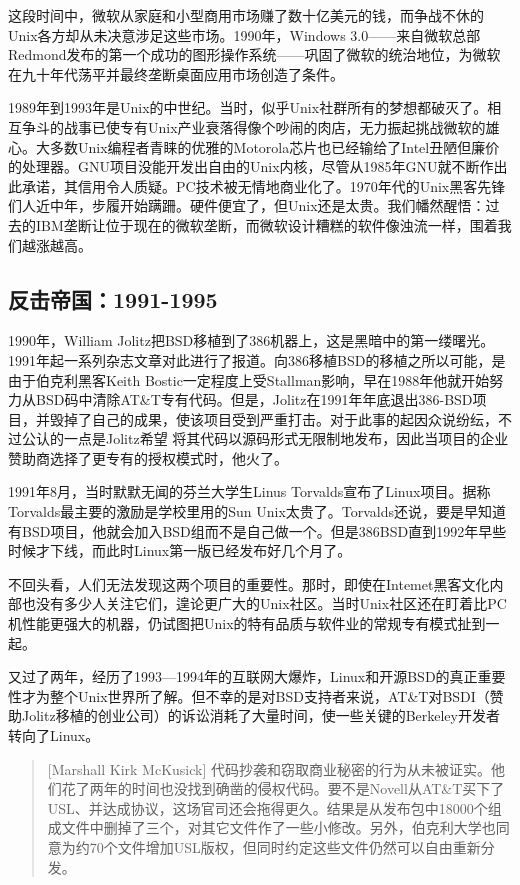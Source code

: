\documentclass[11pt,oneside]{book}
\begin{document}
\begin{common-format}
这段时间中，微软从家庭和小型商用市场赚了数十亿美元的钱，而争战不休的Unix各方却从未决意涉足这些市场。1990年，Windows 3.0——来自微软总部Redmond发布的第一个成功的图形操作系统——巩固了微软的统治地位，为微软在九十年代荡平并最终垄断桌面应用市场创造了条件。

1989年到1993年是Unix的中世纪。当时，似乎Unix社群所有的梦想都破灭了。相互争斗的战事已使专有Unix产业衰落得像个吵闹的肉店，无力振起挑战微软的雄心。大多数Unix编程者青睐的优雅的Motorola芯片也已经输给了Intel丑陋但廉价的处理器。GNU项目没能开发出自由的Unix内核，尽管从1985年GNU就不断作出此承诺，其信用令人质疑。PC技术被无情地商业化了。1970年代的Unix黑客先锋们人近中年，步履开始蹒跚。硬件便宜了，但Unix还是太贵。我们幡然醒悟：过去的IBM垄断让位于现在的微软垄断，而微软设计糟糕的软件像浊流一样，围着我们越涨越高。

\subsection{反击帝国：1991-1995}
1990年，William Jolitz把BSD移植到了386机器上，这是黑暗中的第一缕曙光。1991年起一系列杂志文章对此进行了报道。向386移植BSD的移植之所以可能，是由于伯克利黑客Keith Bostic一定程度上受Stallman影响，早在1988年他就开始努力从BSD码中清除AT\&{}T专有代码。但是，Jolitz在1991年年底退出386-BSD项目，并毁掉了自己的成果，使该项目受到严重打击。对于此事的起因众说纷纭，不过公认的一点是Jolitz希望
将其代码以源码形式无限制地发布，因此当项目的企业赞助商选择了更专有的授权模式时，他火了。

1991年8月，当时默默无闻的芬兰大学生Linus Torvalds宣布了Linux项目。据称Torvalds最主要的激励是学校里用的Sun Unix太贵了。Torvalds还说，要是早知道有BSD项目，他就会加入BSD组而不是自己做一个。但是386BSD直到1992年早些时候才下线，而此时Linux第一版已经发布好几个月了。

不回头看，人们无法发现这两个项目的重要性。那时，即使在Intemet黑客文化内部也没有多少人关注它们，遑论更广大的Unix社区。当时Unix社区还在盯着比PC机性能更强大的机器，仍试图把Unix的特有品质与软件业的常规专有模式扯到一起。

又过了两年，经历了1993—1994年的互联网大爆炸，Linux和开源BSD的真正重要性才为整个Unix世界所了解。但不幸的是对BSD支持者来说，AT\&{}T对BSDI（赞助Jolitz移植的创业公司）的诉讼消耗了大量时间，使一些关键的Berkeley开发者转向了Linux。

\begin{quote}[Marshall Kirk McKusick]
代码抄袭和窃取商业秘密的行为从未被证实。他们花了两年的时间也没找到确凿的侵权代码。要不是Novell从AT\&{}T买下了USL、并达成协议，这场官司还会拖得更久。结果是从发布包中18000个组成文件中删掉了三个，对其它文件作了一些小修改。另外，伯克利大学也同意为约70个文件增加USL版权，但同时约定这些文件仍然可以自由重新分发。
\end{quote}


\end{common-format}
\end{document}
